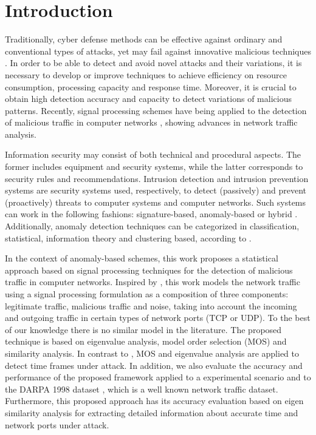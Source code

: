 \documentclass[review]{elsarticle}
\begin{document}
\linenumbers

\section{Introduction}
\label{sec:introduction}

Traditionally, cyber defense methods can be effective against ordinary and conventional types of attacks, yet may fail against innovative malicious techniques \cite{lakhina2005mining}. In order to be able to detect and avoid novel attacks and their variations, it is necessary to develop or improve techniques to achieve efficiency on resource consumption, processing capacity and response time. Moreover, it is crucial to obtain high detection accuracy and capacity to detect variations of malicious patterns. Recently, signal processing schemes have being applied to the detection of malicious traffic in computer networks \cite{Lu2009,Huang2009,Zonglin2009,david2011blind,da2012improved,tenorio2013greatest}, showing advances in network traffic analysis.

Information security may consist of both technical and procedural aspects. The former includes equipment and security systems, while the latter corresponds to security rules and recommendations. Intrusion detection and intrusion prevention systems are security systems used, respectively, to detect (passively) and prevent (proactively) threats to computer systems and computer networks. Such systems can work in the following fashions: signature-based, anomaly-based or hybrid \cite{Huang2009,mudzingwa2012study}. Additionally, anomaly detection techniques can be categorized in classification, statistical, information theory and clustering based, according to \cite{bhuyan2014network,ahmed2016survey,osanaiye2016distributed}.

In the context of anomaly-based schemes, this work proposes a statistical approach based on signal processing techniques for the detection of malicious traffic in computer networks. Inspired by \cite{david2011blind,da2012improved}, this work models the network traffic using a signal processing formulation as a composition of three components: legitimate traffic, malicious traffic and noise, taking into account the incoming and outgoing traffic in certain types of network ports (TCP or UDP). To the best of our knowledge there is no similar model in the literature. The proposed technique is based on eigenvalue analysis, model order selection (MOS) and similarity analysis. In contrast to \cite{david2011blind,da2012improved,tenorio2013greatest}, MOS and eigenvalue analysis are applied to detect time frames under attack. In addition, we also evaluate the accuracy and performance of the proposed framework applied to a experimental scenario and to the DARPA 1998 dataset \citep{osanaiye2016distributed}, which is a well known network traffic dataset. Furthermore, this proposed approach has its accuracy evaluation based on eigen similarity analysis for extracting detailed information about accurate time and network ports under attack. 
\end{document}
